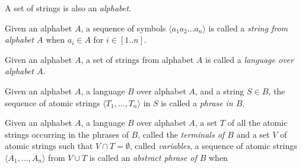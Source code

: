 \documentclass{article}
\newcommand{\nl}{\bigskip\noindent}
\newcommand{\seq}[1]{\langle #1\rangle}
\newcommand{\defcon}[1]{\emph{#1}}
\begin{document}
\nl A set of strings is also an \defcon {alphabet}.


\nl Given an alphabet $A$, a sequence of symbols $\seq{a_1a_2\dots a_n}$  is called a \defcon{string from alphabet $A$}  when  $a_i\in A$ for $i\in[1..n]$.

\nl Given an alphabet $A$, a set of strings from alphabet $A$ is called a \defcon{language over alphabet $A$}.

\nl Given an alphabet $A$, a language $B$ over alphabet $A$, and a string $S\in B$, the sequence of atomic strings $\seq{T_1,\dots, T_n}$ in $S$ is called a \defcon{phrase in $B$}.
 
 
 
\nl Given an alphabet $A$, a language $B$ over alphabet $A$, a set $T$ of all the atomic strings occurring in the phrases of $B$, called the \defcon{terminals of $B$} and a set $V$ of atomic strings such that $V\cap T = \emptyset$, called \defcon{variables}, a sequence of atomic strings $\seq{A_1, \dots, A_n}$ from $V\cup T$ is called an \defcon{abstract phrase of $B$} when  
\end{document}
